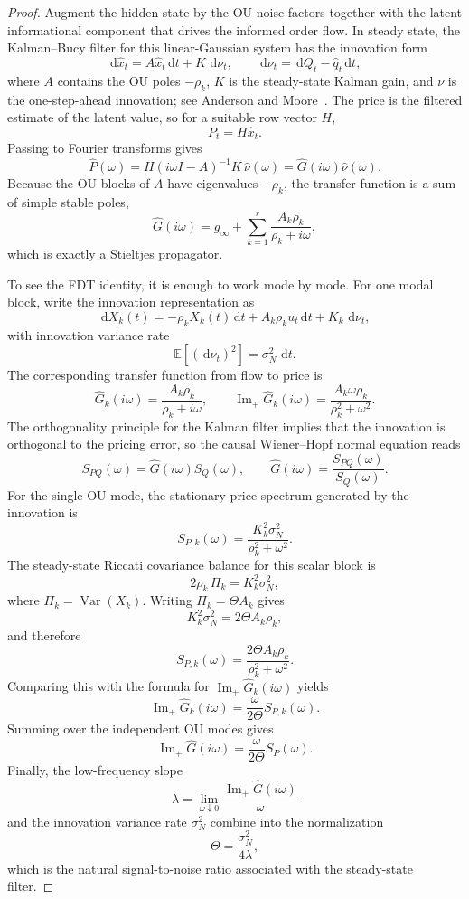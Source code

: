 \documentclass[11pt]{article}
\newcommand{\E}{\mathbb{E}}
\newcommand{\Ghat}{\widehat{G}}
\newcommand{\ImPart}{\operatorname{Im}_{\!+}}
\newcommand{\dd}{\,\mathrm{d}}
\begin{document}
\begin{proof}
Augment the hidden state by the OU noise factors together with the latent informational component that drives the informed order flow. In steady state, the Kalman--Bucy filter for this linear-Gaussian system has the innovation form
\[
  \dd \hat x_t=A\hat x_t\dd t+K\,\dd \nu_t,
  \qquad
  \dd \nu_t=\dd Q_t-\hat q_t\dd t,
\]
where $A$ contains the OU poles $-\rho_k$, $K$ is the steady-state Kalman gain, and $\nu$ is the one-step-ahead innovation; see Anderson and Moore~\cite{AndersonMoore1979}. The price is the filtered estimate of the latent value, so for a suitable row vector $H$,
\[
  P_t=H\hat x_t.
\]
Passing to Fourier transforms gives
\[
  \widehat{P}(\omega)=H(i\omega I-A)^{-1}K\,\widehat{\nu}(\omega)=\Ghat(i\omega)\widehat{\nu}(\omega).
\]
Because the OU blocks of $A$ have eigenvalues $-\rho_k$, the transfer function is a sum of simple stable poles,
\[
  \Ghat(i\omega)=g_\infty+\sum_{k=1}^r \frac{A_k\rho_k}{\rho_k+i\omega},
\]
which is exactly a Stieltjes propagator.

To see the FDT identity, it is enough to work mode by mode. For one modal block, write the innovation representation as
\[
  \dd X_k(t)=-\rho_k X_k(t)\dd t + A_k\rho_k u_t\dd t + K_k\,\dd \nu_t,
\]
with innovation variance rate
\[
  \E[(\dd \nu_t)^2]=\sigma_N^2\,\dd t.
\]
The corresponding transfer function from flow to price is
\[
  \widehat{G}_k(i\omega)=\frac{A_k\rho_k}{\rho_k+i\omega},
  \qquad
  \ImPart \widehat{G}_k(i\omega)=\frac{A_k\omega\rho_k}{\rho_k^2+\omega^2}.
\]
The orthogonality principle for the Kalman filter implies that the innovation is orthogonal to the pricing error, so the causal Wiener--Hopf normal equation reads
\[
  S_{PQ}(\omega)=\Ghat(i\omega)S_Q(\omega),
  \qquad
  \Ghat(i\omega)=\frac{S_{PQ}(\omega)}{S_Q(\omega)}.
\]
For the single OU mode, the stationary price spectrum generated by the innovation is
\[
  S_{P,k}(\omega)
  =
  \frac{K_k^2\sigma_N^2}{\rho_k^2+\omega^2}.
\]
The steady-state Riccati covariance balance for this scalar block is
\[
  2\rho_k\,\Pi_k=K_k^2\sigma_N^2,
\]
where $\Pi_k=\operatorname{Var}(X_k)$. Writing $\Pi_k=\Theta A_k$ gives
\[
  K_k^2\sigma_N^2=2\Theta A_k\rho_k,
\]
and therefore
\[
  S_{P,k}(\omega)=\frac{2\Theta A_k\rho_k}{\rho_k^2+\omega^2}.
\]
Comparing this with the formula for $\ImPart \widehat{G}_k(i\omega)$ yields
\[
  \ImPart \widehat{G}_k(i\omega)=\frac{\omega}{2\Theta}S_{P,k}(\omega).
\]
Summing over the independent OU modes gives
\[
  \ImPart \Ghat(i\omega)=\frac{\omega}{2\Theta}S_P(\omega).
\]
Finally, the low-frequency slope
\[
  \lambda=\lim_{\omega\downarrow 0}\frac{\ImPart \Ghat(i\omega)}{\omega}
\]
and the innovation variance rate $\sigma_N^2$ combine into the normalization
\[
  \Theta=\frac{\sigma_N^2}{4\lambda},
\]
which is the natural signal-to-noise ratio associated with the steady-state filter.
\end{proof}
\end{document}
